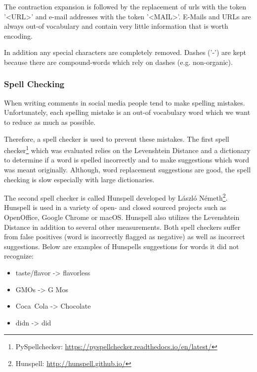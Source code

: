 
The contraction expansion is followed by the replacement of \glspl{url} with the token '<URL>' and e-mail addresses with the token '<MAIL>'. E-Mails and URLs are always out-of vocabulary and contain very little information that is worth encoding. 


In addition any special characters are completely removed. Dashes ('-') are kept because there are compound-words which rely on dashes (e.g. non-organic).

\subsubsection*{Spell Checking}
\label{sec:05_SpellChecking}
When writing comments in social media people tend to make spelling mistakes. Unfortunately, each spelling mistake is an out-of vocabulary word which we want to reduce as much as possible.

Therefore, a spell checker is used to prevent these mistakes. The first spell checker\footnote{PySpellchecker: \hyperlink{https://pyspellchecker.readthedocs.io/en/latest/}{https://pyspellchecker.readthedocs.io/en/latest/}} which was evaluated relies on the Levenshtein Distance \cite{Levenshtein1966} and a dictionary to determine if a word is spelled incorrectly and to make suggestions which word was meant originally. Although, word replacement suggestions are good, the spell checking is slow especially with large dictionaries.

The second spell checker is called Hunspell developed by László Németh\footnote{Hunspell: \hyperlink{http://hunspell.github.io/}{http://hunspell.github.io/}}. Hunspell is used in a variety of open- and closed sourced projects such as OpenOffice, Google Chrome or macOS. Hunspell also utilizes the Levenshtein Distance in addition to several other measurements. Both spell checkers suffer from false positives {(word is incorrectly flagged as negative)} as well as incorrect suggestions. Below are examples of Hunspells suggestions for words it did not recognize:

\begin{itemize}
	\item taste/flavor -> flavorless
	\item GMOs -> G Mos
	\item Coca~Cola -> Chocolate
	\item didn -> did
\end{itemize}

